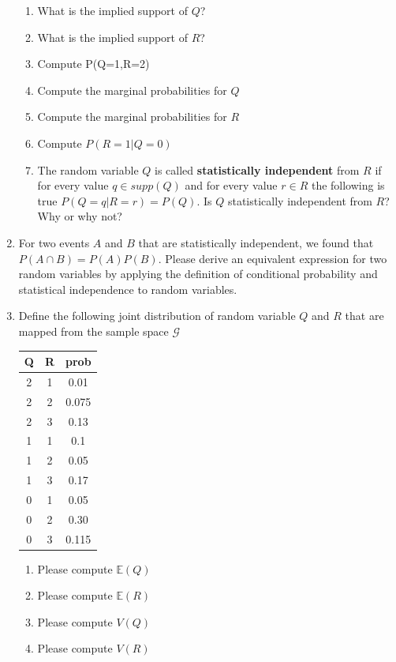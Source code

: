 \begin{enumerate}
    \begin{enumerate}
        \item What is the implied support of $Q$?
        \item What is the implied support of $R$?
        \item Compute P(Q=1,R=2)
        \item Compute the marginal probabilities for $Q$
        \item Compute the marginal probabilities for $R$
        \item Compute $P(R=1 | Q=0)$
        \item The random variable $Q$ is called \textbf{statistically independent} from $R$ if for every value $q \in supp(Q)$ and for every value $r \in R$ the following is true $P(Q=q |R=r) = P(Q)$. Is $Q$ statistically independent from $R$? Why or why not?
    \end{enumerate}
    \item For two events $A$ and $B$ that are statistically independent, we found that $P(A \cap B) = P(A)P(B)$. Please derive an equivalent expression for two random variables by applying the definition of conditional probability and statistical independence to random variables.

    \item Define the following joint distribution of random variable $Q$ and $R$ that are mapped from the sample space $\mathcal{G}$
    \begin{table}[ht!]
    \centering
    \begin{tabular}{c c | c}
        Q & R & prob \\
        \hline
        2 & 1 & 0.01\\
        2 & 2 & 0.075\\
        2 & 3 & 0.13\\
        1 & 1 & 0.1\\
        1 & 2 & 0.05\\
        1 & 3 & 0.17\\
        0 & 1 & 0.05\\
        0 & 2 & 0.30\\
        0 & 3 & 0.115
    \end{tabular}
    \end{table}
     \begin{enumerate}
         \item Please compute $\mathbb{E}(Q)$
         \item Please compute $\mathbb{E}(R)$
         \item Please compute $V(Q)$
         \item Please compute $V(R)$
     \end{enumerate}


\end{enumerate}

